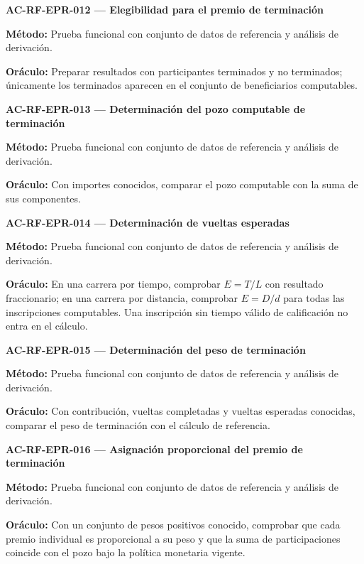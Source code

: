 \documentclass[10pt,letterpaper]{article}
\begin{document}
\noindent\textbf{AC-RF-EPR-012 --- Elegibilidad para el premio de terminación}\par
\textbf{Método:} Prueba funcional con conjunto de datos de referencia y análisis de derivación.\par
\textbf{Oráculo:} Preparar resultados con participantes terminados y no terminados; únicamente los terminados aparecen en el conjunto de beneficiarios computables.\par\vspace{0.45em}
\noindent\textbf{AC-RF-EPR-013 --- Determinación del pozo computable de terminación}\par
\textbf{Método:} Prueba funcional con conjunto de datos de referencia y análisis de derivación.\par
\textbf{Oráculo:} Con importes conocidos, comparar el pozo computable con la suma de sus componentes.\par\vspace{0.45em}
\noindent\textbf{AC-RF-EPR-014 --- Determinación de vueltas esperadas}\par
\textbf{Método:} Prueba funcional con conjunto de datos de referencia y análisis de derivación.\par
\textbf{Oráculo:} En una carrera por tiempo, comprobar $E=T/L$ con resultado fraccionario; en una carrera por distancia, comprobar $E=D/d$ para todas las inscripciones computables. Una inscripción sin tiempo válido de calificación no entra en el cálculo.\par\vspace{0.45em}
\noindent\textbf{AC-RF-EPR-015 --- Determinación del peso de terminación}\par
\textbf{Método:} Prueba funcional con conjunto de datos de referencia y análisis de derivación.\par
\textbf{Oráculo:} Con contribución, vueltas completadas y vueltas esperadas conocidas, comparar el peso de terminación con el cálculo de referencia.\par\vspace{0.45em}
\noindent\textbf{AC-RF-EPR-016 --- Asignación proporcional del premio de terminación}\par
\textbf{Método:} Prueba funcional con conjunto de datos de referencia y análisis de derivación.\par
\textbf{Oráculo:} Con un conjunto de pesos positivos conocido, comprobar que cada premio individual es proporcional a su peso y que la suma de participaciones coincide con el pozo bajo la política monetaria vigente.\par\vspace{0.45em}
\end{document}
